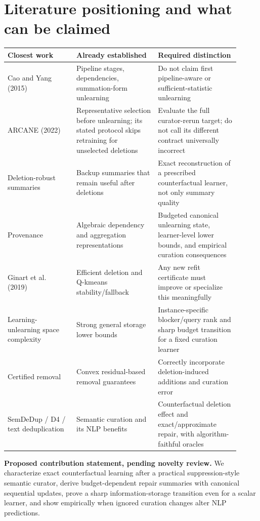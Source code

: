 \documentclass[11pt,a4paper]{article}
\theoremstyle{definition}\newtheorem{definition}[theorem]{Definition}
\begin{document}
\section{Literature positioning and what can be claimed}
\begin{longtable}{p{0.27\linewidth}p{0.32\linewidth}p{0.32\linewidth}}
\toprule
Closest work & Already established & Required distinction\\\midrule\endhead
Cao and Yang (2015)~\cite{cao2015} & Pipeline stages, dependencies, summation-form unlearning & Do not claim first pipeline-aware or sufficient-statistic unlearning\\[4pt]
ARCANE (2022)~\cite{arcane} & Representative selection before unlearning; its stated protocol skips retraining for unselected deletions & Evaluate the full curator-rerun target; do not call its different contract universally incorrect\\[4pt]
Deletion-robust summaries~\cite{mirzasoleiman2017,kazemi2018} & Backup summaries that remain useful after deletions & Exact reconstruction of a prescribed counterfactual learner, not only summary quality\\[4pt]
Provenance~\cite{green2007,amsterdamer2011} & Algebraic dependency and aggregation representations & Budgeted canonical unlearning state, learner-level lower bounds, and empirical curation consequences\\[4pt]
Ginart et al. (2019)~\cite{ginart2019} & Efficient deletion and Q-kmeans stability/fallback & Any new refit certificate must improve or specialize this meaningfully\\[4pt]
Learning-unlearning space complexity~\cite{cherapanamjeri2025} & Strong general storage lower bounds & Instance-specific blocker/query rank and sharp budget transition for a fixed curation learner\\[4pt]
Certified removal~\cite{guo2020} & Convex residual-based removal guarantees & Correctly incorporate deletion-induced additions and curation error\\[4pt]
SemDeDup / D4 / text deduplication~\cite{semdedup,d4,lee2022} & Semantic curation and its NLP benefits & Counterfactual deletion effect and exact/approximate repair, with algorithm-faithful oracles\\
\bottomrule
\end{longtable}

\textbf{Proposed contribution statement, pending novelty review.} We characterize exact counterfactual learning after a practical suppression-style semantic curator, derive budget-dependent repair summaries with canonical sequential updates, prove a sharp information-storage transition even for a scalar learner, and show empirically when ignored curation changes alter NLP predictions.
\end{document}
